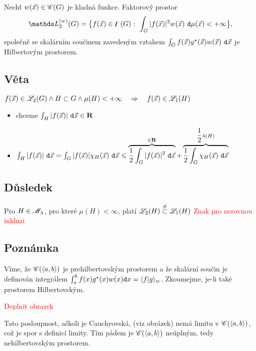 Nech\v t $w({\vec{x}})\in\mathscr{C}(G)$ je kladná funkce. Faktorov\'y prostor
%
$$\LL_2^{(w)}(G)=\bigl\{f(\x)\in\digamma(G):~\int_G |f(\x)|^2 w(\x)~\dmu(\x)<+\infty\bigr\},$$
%
spole\v cn\v e se skal\'arn\'im sou\v cinem zaveden\'ym vztahem  $\int_G f({\vec{x}})g^\star({\vec{x}})w({\vec{x}})~\mathtt{d}{\vec{x}}$ je Hilbertov\'ym prostorem.\\

\subsection{Věta}

$f({\vec{x}}) \in {\mathscr L}_2(G) \wedge H \subset G \wedge \mu(H)<+\infty \quad \Rightarrow \quad f({\vec{x}})\in {\mathscr L}_1(H)$\\

\Proof

\begin{itemize}
\item chceme $\int_H |f({\vec{x}})|~\mathtt{d}{\vec{x}} \in {\mathbf R}$
\item $\int_H |f({\vec{x}})|~\mathtt{d}{\vec{x}} = \int_G |f({\vec{x}})|\chi_H({\vec{x}})~\mathtt{d}{\vec{x}} \leqslant \overbrace{\dfrac{1}{2}\int_G |f({\vec{x}})|^2~\mathtt{d}{\vec{x}}}^{\in {\mathbf R}} + \overbrace{\dfrac{1}{2}\int_G \chi_H({\vec{x}})~\mathtt{d}{\vec{x}}}^{\dfrac{1}{2}\lambda(H)}$
\end{itemize}

\subsection{Důsledek}

Pro $H\in\mathscr{M}_\lambda$, pro kter\'e $\mu(H) < \infty$, plat\'i ${\mathscr L}_2(H)\overset{\neq}{\subset}{\mathscr L}_1(H)$
\textcolor{red}{Znak pro nerovnou inkluzi}

\subsection{Pozn\'amka}
V\'ime, \v ze $\mathscr{C}(\langle a,b\rangle)$ je prehilbertovsk\'ym prostorem a \v ze skal\'arn\'i sou\v cin je definov\'an integr\'alem $\int_a^b f(x)g^\star(x)w(x)\mathtt{d}x = \langle f|g\rangle_w$. Zkoumejme, je-li tak\'e prostorem Hilbertovsk\'ym.

\textcolor{red}{Doplnit obrazek}

Tato posloupnost, a\v ckoli je Cauchyovsk\'a, (viz obr\'azek) nem\'a limitu v $\mathscr{C}(\langle a,b\rangle)$, co\v z je spor s definic\'i limity. T\'im p\'adem je $\mathscr{C}(\langle a,b\rangle)$ ne\'upln\'ym, tedy nehilbertovsk\'ym prostorem.

